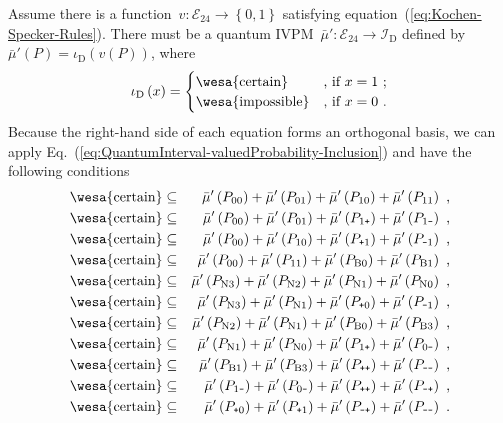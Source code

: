 \documentclass[english,reprint, aps, prl,superscriptaddress, showpacs,
showkeys, longbibliography, amsmath, amssymb]{revtex4-1}
\theoremstyle{plain}
\theoremstyle{definition}
\newcommand{\events}{\ensuremath{\mathcal{E}}}
\newcommand{\imposs}{{\text{\wesa{impossible}}}}
\newcommand{\necess}{{\text{\wesa{certain}}}}
\newcommand{\ps}{\texttt{+}}
\newcommand{\ms}{\texttt{-}}
\begin{document}
Assume there is a function~$v:\events_{24}\rightarrow\left\{ 0,1\right\} $
satisfying equation~(\ref{eq:Kochen-Specker-Rules}). There must
be a quantum IVPM~$\bar{\mu}':\events_{24}\rightarrow\mathscr{I}_{\mathrm{D}}$
defined by $\bar{\mu}'\left(P\right)=\iota_{\mathrm{D}}\left(v\left(P\right)\right)$,
where 
\begin{equation}
\iota_{\mathrm{D}}\left(x\right)=\begin{cases}
\necess & \text{, if }x=1\text{ ;}\\
\imposs & \text{, if }x=0\text{ .}
\end{cases}\label{eq:homomorphism-0}
\end{equation}
Because the right-hand side of each equation forms an orthogonal basis,
we can apply Eq.~(\ref{eq:QuantumInterval-valuedProbability-Inclusion})
and have the following conditions
\begin{eqnarray*}
\necess & \subseteq & \bar{\mu}'\left(P_{00}\right)+\bar{\mu}'\left(P_{01}\right)+\bar{\mu}'\left(P_{10}\right)+\bar{\mu}'\left(P_{11}\right)\textrm{ ,}\\
\necess & \subseteq & \bar{\mu}'\left(P_{00}\right)+\bar{\mu}'\left(P_{01}\right)+\bar{\mu}'\left(P_{1\ps}\right)+\bar{\mu}'\left(P_{1\ms}\right)\textrm{ ,}\\
\necess & \subseteq & \bar{\mu}'\left(P_{00}\right)+\bar{\mu}'\left(P_{10}\right)+\bar{\mu}'\left(P_{\ps1}\right)+\bar{\mu}'\left(P_{\ms1}\right)\textrm{ ,}\\
\necess & \subseteq & \bar{\mu}'\left(P_{00}\right)+\bar{\mu}'\left(P_{11}\right)+\bar{\mu}'\left(P_{\textrm{B}0}\right)+\bar{\mu}'\left(P_{\textrm{B}1}\right)\textrm{ ,}\\
\necess & \subseteq & \bar{\mu}'\left(P_{\textrm{N}3}\right)+\bar{\mu}'\left(P_{\textrm{N}2}\right)+\bar{\mu}'\left(P_{\textrm{N}1}\right)+\bar{\mu}'\left(P_{\textrm{N}0}\right)\textrm{ ,}\\
\necess & \subseteq & \bar{\mu}'\left(P_{\textrm{N}3}\right)+\bar{\mu}'\left(P_{\textrm{N}1}\right)+\bar{\mu}'\left(P_{\ps0}\right)+\bar{\mu}'\left(P_{\ms1}\right)\textrm{ ,}\\
\necess & \subseteq & \bar{\mu}'\left(P_{\textrm{N}2}\right)+\bar{\mu}'\left(P_{\textrm{N}1}\right)+\bar{\mu}'\left(P_{\textrm{B}0}\right)+\bar{\mu}'\left(P_{\textrm{B}3}\right)\textrm{ ,}\\
\necess & \subseteq & \bar{\mu}'\left(P_{\textrm{N}1}\right)+\bar{\mu}'\left(P_{\textrm{N}0}\right)+\bar{\mu}'\left(P_{1\ps}\right)+\bar{\mu}'\left(P_{0\ms}\right)\textrm{ ,}\\
\necess & \subseteq & \bar{\mu}'\left(P_{\textrm{B}1}\right)+\bar{\mu}'\left(P_{\textrm{B}3}\right)+\bar{\mu}'\left(P_{\ps\ps}\right)+\bar{\mu}'\left(P_{\ms\ms}\right)\textrm{ ,}\\
\necess & \subseteq & \bar{\mu}'\left(P_{1\ms}\right)+\bar{\mu}'\left(P_{0\ms}\right)+\bar{\mu}'\left(P_{\ps\ps}\right)+\bar{\mu}'\left(P_{\ms\ps}\right)\textrm{ ,}\\
\necess & \subseteq & \bar{\mu}'\left(P_{\ps0}\right)+\bar{\mu}'\left(P_{\ps1}\right)+\bar{\mu}'\left(P_{\ms\ps}\right)+\bar{\mu}'\left(P_{\ms\ms}\right)\textrm{ .}
\end{eqnarray*}
\end{document}
